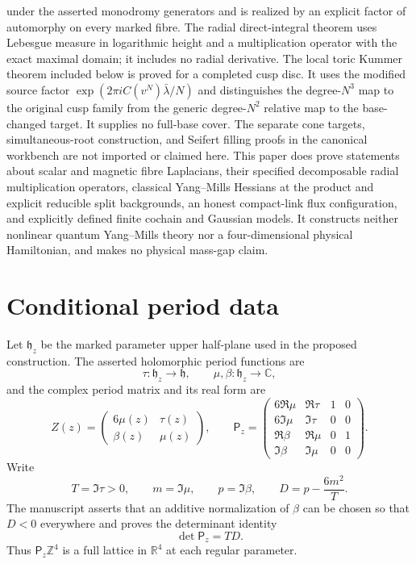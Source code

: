 \documentclass[11pt]{article}
\numberwithin{equation}{section}
\theoremstyle{definition}
\theoremstyle{remark}
\newcommand{\R}{\mathbb R}
\newcommand{\C}{\mathbb C}
\newcommand{\Z}{\mathbb Z}
\begin{document}
under the asserted monodromy generators and is realized by an explicit factor
of automorphy on every marked fibre.  The radial direct-integral theorem uses
Lebesgue measure in logarithmic height and a multiplication operator with the
exact maximal domain; it includes no radial derivative.
The local toric Kummer theorem included below is proved for a completed cusp
disc.  It uses the modified source factor
$\exp(2\pi iC(v^N)\bar\lambda/N)$ and distinguishes the degree-$N^3$ map
to the original cusp family from the generic degree-$N^2$ relative map to
the base-changed target.  It supplies no full-base cover.  The separate cone
targets, simultaneous-root construction, and Seifert filling proofs in the
canonical workbench are not imported or claimed here.  This paper does prove
statements about scalar and magnetic fibre Laplacians, their specified
decomposable radial multiplication operators, classical Yang--Mills Hessians
at the product and explicit reducible split backgrounds, an honest
compact-link flux configuration, and explicitly defined finite cochain and
Gaussian models.  It constructs neither nonlinear quantum Yang--Mills theory
nor a four-dimensional physical Hamiltonian, and makes no physical mass-gap
claim.

\section{Conditional period data}

Let $\mathfrak h_z$ be the marked parameter upper half-plane used in the proposed construction.  The asserted holomorphic period functions are
\[
 \tau:\mathfrak h_z\longrightarrow\mathfrak h,
 \qquad \mu,\beta:\mathfrak h_z\longrightarrow\C,
\]
and the complex period matrix and its real form are
\begin{equation}\label{eq:Z-P}
 Z(z)=\begin{pmatrix}6\mu(z)&\tau(z)\\ \beta(z)&\mu(z)\end{pmatrix},
 \qquad
 \mathsf P_z=
 \begin{pmatrix}
 6\Re\mu&\Re\tau&1&0\\
 6\Im\mu&\Im\tau&0&0\\
 \Re\beta&\Re\mu&0&1\\
 \Im\beta&\Im\mu&0&0
 \end{pmatrix}.
\end{equation}
Write
\begin{equation}\label{eq:D}
 T=\Im\tau>0,
 \qquad m=\Im\mu,
 \qquad p=\Im\beta,
 \qquad D=p-\frac{6m^2}{T}.
\end{equation}
The manuscript asserts that an additive normalization of $\beta$ can be chosen so that $D<0$ everywhere and proves the determinant identity
\begin{equation}\label{eq:detP}
 \det\mathsf P_z=T D.
\end{equation}
Thus $\mathsf P_z\Z^4$ is a full lattice in $\R^4$ at each regular parameter.
\end{document}
